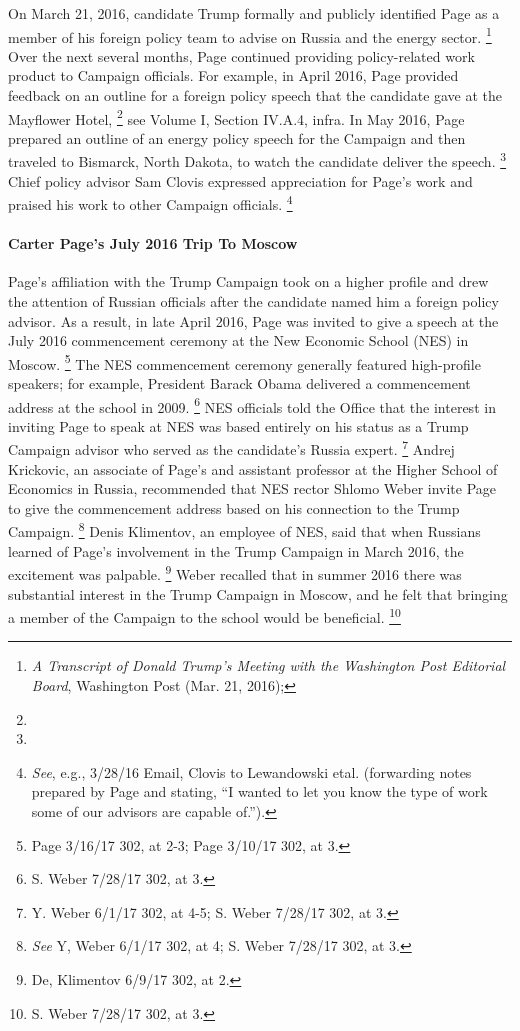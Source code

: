 On March 21, 2016, candidate Trump formally and publicly identified Page as a member of his foreign policy team to advise on Russia and the energy sector.%
\footnote{\textit{A Transcript of Donald Trump’s Meeting with the Washington Post Editorial Board}, Washington Post (Mar. 21, 2016); }
Over the next several months, Page continued providing policy-related work product to Campaign officials.
For example, in April 2016, Page provided feedback on an outline for a foreign policy speech that the candidate gave at the Mayflower Hotel,%
\footnote{}
see Volume I, Section IV.A.4, infra.
In May 2016, Page prepared an outline of an energy policy speech for the Campaign and then traveled to Bismarck, North Dakota, to watch the candidate deliver the speech.%
\footnote{}
Chief policy advisor Sam Clovis expressed appreciation for Page's work and praised his work to other Campaign officials.%
\footnote{\textit{See}, e.g., 3/28/16 Email, Clovis to Lewandowski etal.
(forwarding notes prepared by Page and stating, “I wanted to let you know the type of work some of our advisors are capable of.”).}

\paragraph{Carter Page's July 2016 Trip To Moscow}

Page's affiliation with the Trump Campaign took on a higher profile and drew the attention of Russian officials after the candidate named him a foreign policy advisor.
As a result, in late April 2016, Page was invited to give a speech at the July 2016 commencement ceremony at the New Economic School (NES) in Moscow.%
\footnote{Page 3/16/17 302, at 2-3; Page 3/10/17 302, at 3.}
The NES commencement ceremony generally featured high-profile speakers; for example, President Barack Obama delivered a commencement address at the school in 2009.%
\footnote{S. Weber 7/28/17 302, at 3.}
NES officials told the Office that the interest in inviting Page to speak at NES was based entirely on his status as a Trump Campaign advisor who served as the candidate's Russia expert.%
\footnote{Y. Weber 6/1/17 302, at 4-5;
S. Weber 7/28/17 302, at 3.}
Andrej Krickovic, an associate of Page's and assistant professor at the Higher School of Economics in Russia, recommended that NES rector Shlomo Weber invite Page to give the commencement address based on his connection to the Trump Campaign.%
\footnote{\textit{See} Y, Weber 6/1/17 302, at 4;
S. Weber 7/28/17 302, at 3.}
Denis Klimentov, an employee of NES, said that when Russians learned of Page's involvement in the Trump Campaign in March 2016, the excitement was palpable.%
\footnote{De, Klimentov 6/9/17 302, at 2.}
Weber recalled that in summer 2016 there was substantial interest in the Trump Campaign in Moscow, and he felt that bringing a member of the Campaign to the school would be beneficial.%
\footnote{S. Weber 7/28/17 302, at 3.}

